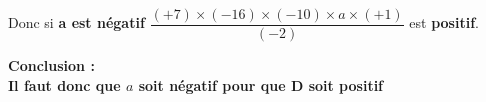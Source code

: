 \begin{corrige}
\begin{enumerate}
           \medskip
            Donc si {\bfseries \color{black}a est négatif} $ \dfrac {(+7)\times (-16)\times (-10)\times a\times (+1)}{(-2)} $ est {\bfseries \color{black}positif}.
           
           \medskip
            {\bfseries \color[HTML]{f15929}Conclusion :} \\
           {\bfseries \color{black}Il faut donc que $ a $ soit négatif pour que D soit positif}
           
        \end{enumerate}
\end{corrige}

